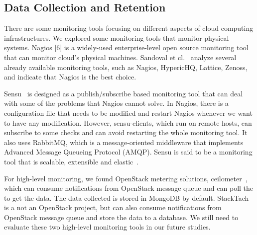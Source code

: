 \subsection{Data Collection and Retention}


There are some monitoring tools focusing on different aspects of cloud computing infrastructures. We explored some monitoring tools that monitor physical systems. Nagios [6] is a widely-used enterprise-level open source monitoring tool that can monitor cloud's physical machines. Sandoval et cl.~\cite{sandoval2012evaluation} analyze several already available monitoring tools, such as Nagios, HypericHQ, Lattice, Zenoss, and indicate that Nagios is the best choice. 

Sensu~\cite{sensu} is designed as a publish/subscribe based monitoring tool that can deal with some of the problems that Nagios cannot solve. In Nagios, there is a configuration file that needs to be modified and restart Nagios whenever we want to have any modification. However, sensu-clients, which run on remote hosts, can subscribe to some checks and can avoid restarting the whole monitoring tool. It also uses RabbitMQ, which is a message-oriented middleware that implements Advanced Message Queueing Protocol (AMQP). Sensu is said to be a monitoring tool that is scalable, extensible and elastic~\cite{Aceto2013}. 

For high-level monitoring, we found OpenStack metering solutions, ceilometer~\cite{ceilometer}, which can consume notifications from OpenStack message queue and can poll the to get the data. The data collected is stored in MongoDB by default. StackTach~\cite{stacktach} is a not an OpenStack project, but can also consume notifications from  OpenStack message queue and store the data to a database. We still need to evaluate these two high-level monitoring tools in our future studies.